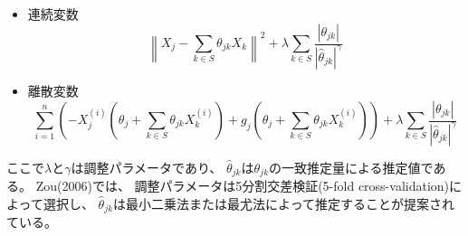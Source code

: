\begin{itemize}
  \item
    連続変数
    \begin{equation}
      \label{adalasso_C}
      \left\| X_j - \sum_{k \in S} \theta_{jk}X_k \right\|^2
        + \lambda \sum_{k\in S} \frac{|\theta_{jk}|}{|\widehat{\theta}_{jk}|^\gamma}
    \end{equation}
  \item
    離散変数
    \begin{equation}
      \label{adalasso_D}
      \sum_{i=1}^n \left( -X_j^{(i)}\left( \theta_j + \sum_{k\in S}\theta_{jk}X_k^{(i)} \right)
        + g_j\left( \theta_j + \sum_{k\in S}\theta_{jk}X_k^{(i)} \right) \right)
        + \lambda \sum_{k\in S} \frac{|\theta_{jk}|}{|\widehat{\theta}_{jk}|^\gamma}
    \end{equation}
\end{itemize}

ここで$\lambda$と$\gamma$は調整パラメータであり、
$\widehat{\theta}_{jk}$は$\theta_{jk}$の一致推定量による推定値である。
Zou(2006)\cite{Zou2006-pi}では、
調整パラメータは5分割交差検証(5-fold cross-validation)によって選択し、
$\widehat{\theta}_{jk}$は最小二乗法または最尤法によって推定することが提案されている。


